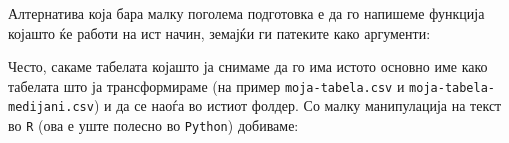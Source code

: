 \documentclass[
]{book}
\newenvironment{Shaded}{\begin{snugshade}}{\end{snugshade}}
\newcommand{\CommentTok}[1]{\textcolor[rgb]{0.56,0.35,0.01}{\textit{#1}}}
\newcommand{\ControlFlowTok}[1]{\textcolor[rgb]{0.13,0.29,0.53}{\textbf{#1}}}
\newcommand{\DataTypeTok}[1]{\textcolor[rgb]{0.13,0.29,0.53}{#1}}
\newcommand{\KeywordTok}[1]{\textcolor[rgb]{0.13,0.29,0.53}{\textbf{#1}}}
\newcommand{\NormalTok}[1]{#1}
\newcommand{\OperatorTok}[1]{\textcolor[rgb]{0.81,0.36,0.00}{\textbf{#1}}}
\newcommand{\StringTok}[1]{\textcolor[rgb]{0.31,0.60,0.02}{#1}}
\begin{document}
Алтернатива која бара малку поголема подготовка е да го напишеме функција којашто ќе работи на ист начин, земајќи ги патеките како аргументи:

\begin{Shaded}
\end{Shaded}

Често, сакаме табелата којашто ја снимаме да го има истото основно име како табелата што ја трансформираме (на пример \texttt{moja-tabela.csv} и \texttt{moja-tabela-medijani.csv}) и да се наоѓа во истиот фолдер. Со малку манипулација на текст во \texttt{R} (ова е уште полесно во \texttt{Python}) добиваме:
\end{document}
